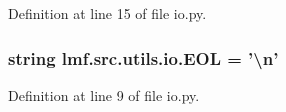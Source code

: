 Definition at line 15 of file io.\+py.

\hypertarget{namespacelmf_1_1src_1_1utils_1_1io_aba483c0f0c8e8321ce08e15fe8b8092a}{
\subsubsection[{E\+O\+L}]{\setlength{\rightskip}{0pt plus 5cm}string lmf.\+src.\+utils.\+io.\+E\+O\+L = '\textbackslash{}n'}}\label{namespacelmf_1_1src_1_1utils_1_1io_aba483c0f0c8e8321ce08e15fe8b8092a}


Definition at line 9 of file io.\+py.

